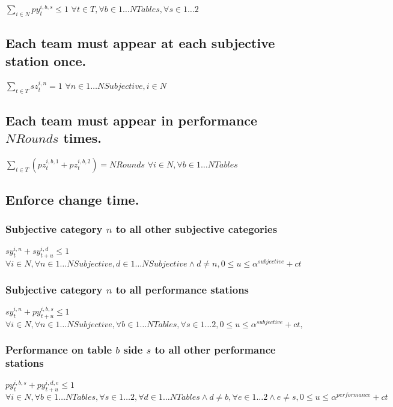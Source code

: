 \documentclass[letterpaper,11pt]{report}
\begin{document}
$\sum\limits_{i \in N} py_{t}^{i,b,s} \le 1$          
\hfill $\forall t \in T, \forall b \in 1 \dots NTables,
\forall s \in 1 \dots 2$


\subsection{Each team must appear at each subjective station once.}
$\sum\limits_{t \in T} sz_{t}^{i,n} = 1$
\hfill $\forall n \in 1 \dots NSubjective, i \in N$

\subsection{Each team must appear in performance $NRounds$ times.}
$\sum\limits_{t \in T} ( pz_{t}^{i,b,1} + pz_{t}^{i,b,2} ) = NRounds$
\hfill $\forall i \in N, \forall b \in 1 \dots NTables$


\subsection{Enforce change time.}

\subsubsection{Subjective category $n$ to all other subjective categories}
$sy_{t}^{i,n} + sy_{t+u}^{i,d} \le 1$
\hfill $\forall i \in N,
\forall n \in 1 \dots NSubjective, 
d \in 1 \dots NSubjective \wedge d \neq n,
0 \le u \le \alpha^{subjective} + ct$

\subsubsection{Subjective category $n$ to all performance stations}
$sy_{t}^{i,n} + py_{t+u}^{i,b,s} \le 1$
\hfill $\forall i \in N,
\forall n \in 1 \dots NSubjective, 
\forall b \in 1 \dots NTables,
\forall s \in 1 \dots 2,
0 \le u \le \alpha^{subjective}+ ct,$

\subsubsection{Performance on table $b$ side $s$ to all other performance stations}
$py_{t}^{i,b,s} + py_{t+u}^{i,d,e} \le 1$
\hfill $\forall i \in N,
\forall b \in 1 \dots NTables,
\forall s \in 1 \dots 2,
\forall d \in 1 \dots NTables \wedge d \neq b,
\forall e \in 1 \dots 2 \wedge e \neq s,
0 \le u \le \alpha^{performance}+ ct$
\end{document}
